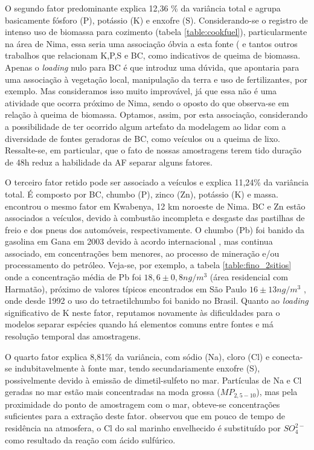 O segundo fator predominante explica 12,36 \% da variância total e agrupa 
basicamente fósforo (P), potássio (K) e enxofre (S). Considerando-se o registro
de intenso uso de biomassa para cozimento (tabela \ref{table:cookfuel}), 
particularmente na área de Nima, essa seria uma associação óbvia a esta fonte
(\citet{reid2005} e tantos outros trabalhos que relacionam K,P,S e BC, 
como indicativos de queima de biomassa. Apenas o \textit{loading} nulo para BC 
é que introduz uma dúvida, que apontaria para uma associação à vegetação local, 
manipulação da terra e uso de fertilizantes, por exemplo. Mas consideramos isso 
muito improvável, já que essa não é uma atividade que ocorra próximo de Nima, 
sendo o oposto do que observa-se em relação à queima de biomassa. Optamos, 
assim, por esta associação, considerando a possibilidade de ter ocorrido algum 
artefato da modelagem ao lidar com a diversidade de fontes geradoras de BC, 
como veículos ou a queima de lixo. Ressalte-se, em particular, que o fato de 
nossas amostragens terem tido duração de 48h reduz a habilidade da AF separar 
alguns fatores.

O terceiro fator retido pode ser associado a veículos e explica 11,24\% da 
variância total. É composto por BC, chumbo (P), zinco (Zn), potássio (K) e 
massa. \citet{aboh2009} encontrou o mesmo fator em Kwabenya, 12 km noroeste de 
Nima. BC e Zn estão associados a veículos, devido à combustão incompleta e 
desgaste das pastilhas de freio e dos pneus dos automóveis, respectivamente. 
O chumbo (Pb) foi banido da gasolina em Gana em 2003 devido à acordo 
internacional \citep{epa2015}, mas continua associado, em concentrações bem 
menores, ao processo de mineração e/ou processamento do petróleo. 
Veja-se, por exemplo, a tabela \ref{table:fino_2sitios} onde a concentração 
média de Pb foi $18,6 \pm 0,8 n g /m^3$ (área residencial com Harmatão), próximo de valores típicos encontrados 
em São Paulo $16 \pm 13 n g /m^3$ \citep{andrade2012}, onde desde 1992 o uso do 
tetraetilchumbo foi banido no Brasil. Quanto ao \textit{loading} significativo 
de K neste fator, reputamos novamente às dificuldades para o modelos separar 
espécies quando há elementos comuns entre fontes e má resolução temporal das 
amostragens.

O quarto fator explica 8,81\% da variância, com sódio (Na), cloro (Cl) e
conecta-se indubitavelmente à fonte mar, tendo secundariamente enxofre (S), 
possivelmente devido à emissão de dimetil-sulfeto no mar.
Partículas de Na e Cl geradas no mar estão mais concentradas na moda grossa 
($MP_{2,5-10}$), mas pela proximidade do ponto de amostragem com o mar, 
obteve-se concentrações suficientes para a extração deste fator. 
\citet{mcinnes1994} observou que em pouco de tempo de residência na atmosfera, 
o Cl do sal marinho envelhecido é substituído por $SO_4^{2-}$ como resultado 
da reação com ácido sulfúrico.


